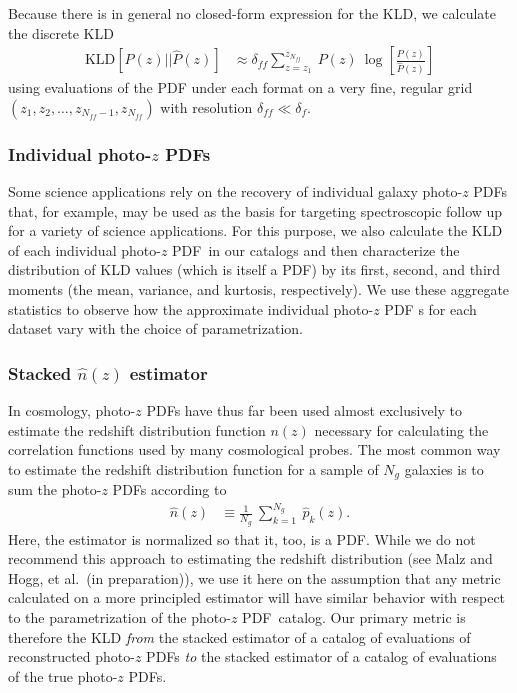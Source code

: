 \documentclass[\docopts]{\docclass}
\newcommand{\pz}{photo-$z$ PDF}
\begin{document}
Because there is in general no closed-form expression for the KLD, we calculate 
the discrete KLD
\begin{align}
  \label{eq:kld_approx}
  \mathrm{KLD}[P(z) || \hat{P}(z)] &\approx 
\delta_{ff}\sum_{z=z_{1}}^{z_{N_{ff}}}\ P(z)\ 
\log\left[\frac{P(z)}{\hat{P}(z)}\right]
\end{align}
using evaluations of the PDF under each format on a very fine, regular grid 
$(z_{1}, z_{2}, \dots, z_{N_{ff}-1}, z_{N_{ff}})$ with resolution 
$\delta_{ff}\ll\delta_{f}$.

\subsubsection{Individual \pz s}
\label{sec:individual_metric}

Some science applications rely on the recovery of individual galaxy \pz s that, 
for example, may be used as the basis for targeting spectroscopic follow up for 
a variety of science applications.
For this purpose, we also calculate the KLD of each individual \pz\ in our 
catalogs and then characterize the distribution of KLD values (which is itself 
a PDF) by its first, second, and third moments (the mean, variance, and 
kurtosis, respectively).
We use these aggregate statistics to observe how the approximate individual \pz 
s for each dataset vary with the choice of parametrization.

\subsubsection{Stacked $\hat{n}(z)$ estimator}
\label{sec:stacked_metric}

In cosmology, \pz s have thus far been used almost exclusively to estimate the 
redshift distribution function $n(z)$ necessary for calculating the correlation 
functions used by many cosmological probes.
The most common way to estimate the redshift distribution function for a sample 
of $N_{g}$ galaxies is to sum the \pz s according to
\begin{align}
  \label{eq:nz}
  \hat{n}(z) &\equiv \frac{1}{N_{g}}\ \sum_{k=1}^{N_{g}}\ \hat{p}_{k}(z).
\end{align}
Here, the estimator is normalized so that it, too, is a PDF.
While we do not recommend this approach to estimating the redshift distribution 
(see Malz and Hogg, et al.\ (in preparation)), we use it here on the assumption 
that any metric calculated on a more principled estimator will have similar 
behavior with respect to the parametrization of the \pz\ catalog.
Our primary metric is therefore the KLD \textit{from} the stacked estimator of 
a catalog of evaluations of reconstructed \pz s \textit{to} the stacked 
estimator of a catalog of evaluations of the true \pz s.
\end{document}
